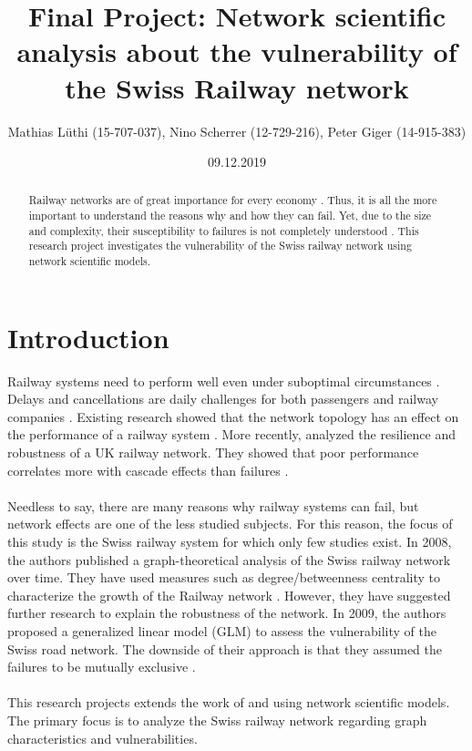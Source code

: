 \documentclass{Resources/netsci-project}
\begin{document}

\title{Final Project: Network scientific analysis about the vulnerability of the Swiss Railway network}
\author{Mathias Lüthi (15-707-037), Nino Scherrer (12-729-216), Peter Giger (14-915-383)}
\date{09.12.2019}

\maketitle

\begin{abstract}
Railway networks are of great importance for every economy \autocite{Resilience}. Thus, it is all the more important to understand the reasons why and how they can fail. Yet, due to the size and complexity, their susceptibility to failures is not completely understood \autocite{Resilience}. This research project investigates the vulnerability of the Swiss railway network using network scientific models.
\end{abstract}


\section{Introduction}
Railway systems need to perform well even under suboptimal circumstances \autocite{Resilience}. Delays and cancellations are daily challenges for both passengers and railway companies \autocite{Resilience}. Existing research showed that the network topology has an effect on the performance of a railway system \autocite{ComplexTopology}. More recently, \textcite{Resilience} analyzed the resilience and robustness of a UK railway network. They showed that poor performance correlates more with cascade effects than failures \autocite{Resilience}.
\\~\\
Needless to say, there are many reasons why railway systems can fail, but network effects are one of the less studied subjects. For this reason, the focus of this study is the Swiss railway system for which only few studies exist. In 2008, the authors \textcite{GraphSwiss} published a graph-theoretical analysis of the Swiss railway network over time. They have used measures such as degree/betweenness centrality to characterize the growth of the Railway network \autocite{GraphSwiss}. However, they have suggested further research to explain the robustness of the network. In 2009, the authors \textcite{VulnerabilitySwiss} proposed a generalized linear model (GLM) to assess the vulnerability of the Swiss road network. The downside of their approach is that they assumed the failures to be mutually exclusive \autocite{VulnerabilitySwiss}. 
\\~\\
This research projects extends the work of \textcite{GraphSwiss} and \textcite{VulnerabilitySwiss} using network scientific models. The primary focus is to analyze the Swiss railway network regarding graph characteristics and vulnerabilities.
\end{document}
